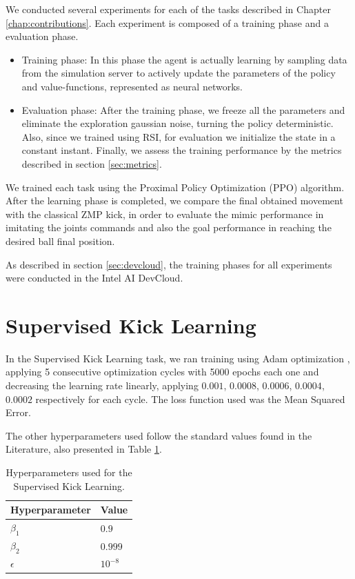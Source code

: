 

We conducted several experiments for each of the tasks described in Chapter \ref{chap:contributions}. Each experiment is composed of a training phase and a evaluation phase.

\begin{itemize}
\item Training phase: In this phase the agent is actually learning by sampling data from the simulation server to actively update the parameters of the policy and value-functions, represented as neural networks.

\item Evaluation phase: After the training phase, we freeze all the parameters and eliminate the exploration gaussian noise, turning the policy deterministic. Also, since we trained using RSI, for evaluation we initialize the state in a constant instant. Finally, we assess the training performance by the metrics described in section \ref{sec:metrics}.
\end{itemize}

We trained each task using the Proximal Policy Optimization (PPO) algorithm. After the learning phase is completed, we compare the final obtained movement with the classical ZMP kick, in order to evaluate the mimic performance in imitating the joints commands and also the goal performance in reaching the desired ball final position.

As described in section \ref{sec:devcloud}, the training phases for all experiments were conducted in the Intel AI DevCloud.

\section{Supervised Kick Learning}

In the Supervised Kick Learning task, we ran training using Adam optimization \cite{adam}, applying 5 consecutive optimization cycles with 5000 epochs each one and decreasing the learning rate linearly, applying $0.001$, $0.0008$, $0.0006$, $0.0004$, $0.0002$ respectively for each cycle. The loss function used was the Mean Squared Error.

The other hyperparameters used follow the standard values found in the Literature, also presented in Table \ref{tab:SL}.

\begin{table}[ht]
    \begin{tabular}{|l|l|}
    \hline
    Hyperparameter            & Value    \\ \hline
    $\beta_1$ 	              & $0.9$ \\
    $\beta_2$                  & $0.999$     \\
    $\epsilon$                & $10^{-8}$     \\
    \hline
    \end{tabular}
\centering
\caption{Hyperparameters used for the Supervised Kick Learning.}
\label{tab:SL}
\end{table}

